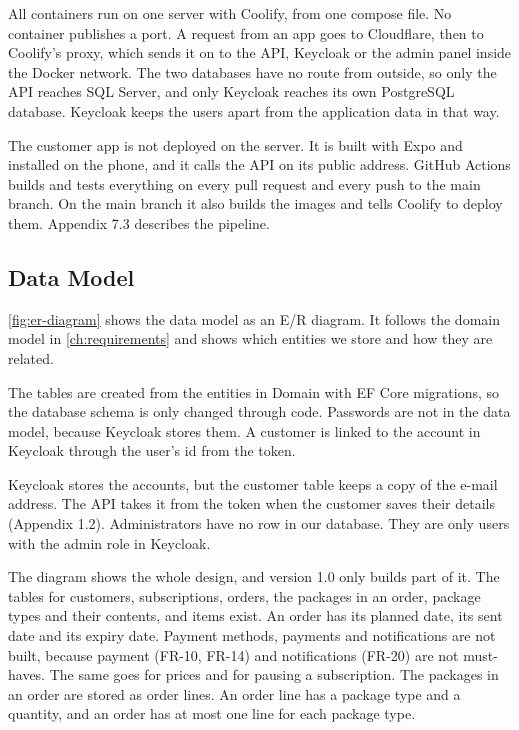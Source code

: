 All containers run on one server with Coolify, from one compose file. No container
publishes a port. A request from an app goes to Cloudflare, then to Coolify's proxy,
which sends it on to the API, Keycloak or the admin panel inside the Docker network. The
two databases have no route from outside, so only the API reaches SQL Server, and only
Keycloak reaches its own PostgreSQL database. Keycloak keeps the users apart from the
application data in that way.

The customer app is not deployed on the server. It is built with Expo and installed on
the phone, and it calls the API on its public address. GitHub Actions builds and tests
everything on every pull request and every push to the main branch. On the main branch
it also builds the images and tells Coolify to deploy them. Appendix 7.3 describes the
pipeline.

\subsection{Data Model}\label{sec:arch-data}

\autoref{fig:er-diagram} shows the data model as an E/R diagram. It follows the domain
model in \autoref{ch:requirements} and shows which entities we store and how they
are related.


The tables are created from the entities in Domain with EF Core migrations, so the
database schema is only changed through code. Passwords are not in the data model,
because Keycloak stores them. A customer is linked to the account in Keycloak through
the user's id from the token.

Keycloak stores the accounts, but the customer table keeps a copy of the e-mail address.
The API takes it from the token when the customer saves their details (Appendix 1.2).
Administrators have
no row in our database. They are only users with the admin role in Keycloak.

The diagram shows the whole design, and version 1.0 only builds part of it. The tables
for customers, subscriptions, orders, the packages in an order, package types and their
contents, and items exist. An order has its planned date, its sent date and its expiry
date. Payment methods, payments and notifications are not built, because payment
(FR-10, FR-14) and notifications (FR-20) are not must-haves. The same goes for prices and for pausing a subscription. The packages in an order are
stored as order lines. An order line has a package type and a quantity, and an order has
at most one line for each package type.
